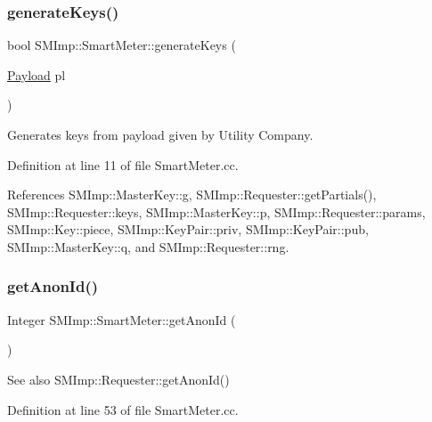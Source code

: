\subsubsection{\texorpdfstring{generate\+Keys()}{generateKeys()}}
{\footnotesize\ttfamily bool S\+M\+Imp\+::\+Smart\+Meter\+::generate\+Keys (\begin{DoxyParamCaption}\item[{\hyperlink{structSMImp_1_1Payload}{Payload}}]{pl }\end{DoxyParamCaption})}

Generates keys from payload given by Utility Company. 

Definition at line 11 of file Smart\+Meter.\+cc.



References S\+M\+Imp\+::\+Master\+Key\+::g, S\+M\+Imp\+::\+Requester\+::get\+Partials(), S\+M\+Imp\+::\+Requester\+::keys, S\+M\+Imp\+::\+Master\+Key\+::p, S\+M\+Imp\+::\+Requester\+::params, S\+M\+Imp\+::\+Key\+::piece, S\+M\+Imp\+::\+Key\+Pair\+::priv, S\+M\+Imp\+::\+Key\+Pair\+::pub, S\+M\+Imp\+::\+Master\+Key\+::q, and S\+M\+Imp\+::\+Requester\+::rng.

\mbox{\label{classSMImp_1_1SmartMeter_ad8721f6b2058318e7acf1ce6afa0757d}} 
\subsubsection{\texorpdfstring{get\+Anon\+Id()}{getAnonId()}}
{\footnotesize\ttfamily Integer S\+M\+Imp\+::\+Smart\+Meter\+::get\+Anon\+Id (\begin{DoxyParamCaption}{ }\end{DoxyParamCaption})}

\begin{DoxySeeAlso}{See also}
S\+M\+Imp\+::\+Requester\+::get\+Anon\+Id() 
\end{DoxySeeAlso}


Definition at line 53 of file Smart\+Meter.\+cc.

\mbox{\label{classSMImp_1_1SmartMeter_a489f430377277201d687642d9a58ab80}} 
